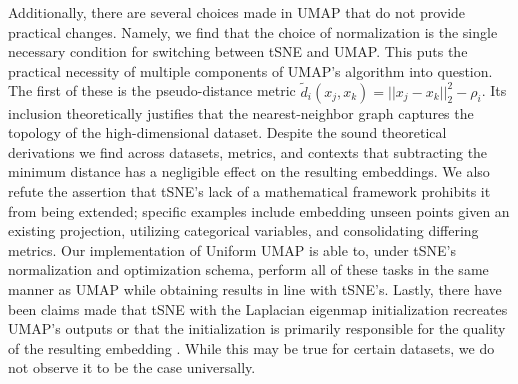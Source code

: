 \documentclass{article}
\theoremstyle{definition}
\begin{document}
Additionally, there are several choices made in UMAP that do not provide practical changes. Namely, we find that the choice of normalization is the
single necessary condition for switching between tSNE and UMAP.
This puts the practical necessity of multiple components of UMAP's algorithm into question. The first of these is the pseudo-distance metric $\tilde{d}_i(x_j, x_k) = ||x_j - x_k||_2^2
- \rho_i$. Its inclusion theoretically justifies that the nearest-neighbor graph captures the topology of the high-dimensional dataset. Despite the sound
theoretical derivations we find across datasets, metrics, and contexts that subtracting the minimum distance has a negligible effect on the resulting
embeddings. We also refute the assertion that tSNE's lack of a mathematical framework prohibits it from being
extended; specific examples include embedding unseen
points given an existing projection, utilizing categorical variables, and consolidating differing metrics. Our implementation of Uniform UMAP is able
to, under tSNE's normalization and optimization schema, perform all of these tasks in the same manner as UMAP while obtaining results in line with tSNE's. Lastly, there have been claims made that tSNE
with the Laplacian eigenmap initialization recreates UMAP's outputs \cite{kobak2019umap} or that the initialization is primarily responsible for the quality of
the resulting embedding \cite{kobak2021initialization}. While this may be true for certain datasets, we do not observe it to be the case universally.
\end{document}
